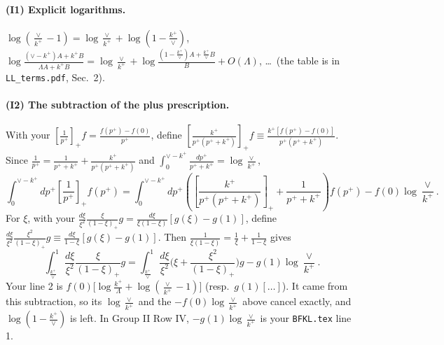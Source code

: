 \documentclass[10pt]{article}
\numberwithin{equation}{section}
\begin{document}
\paragraph{(I1) Explicit logarithms.} $\log(\frac{\vee}{k^+}-1)=\log\frac{\vee}{k^+}+\log(1-\frac{k^+}{\vee})$, $\log\frac{(\vee-k^+)A+k^+B}{\Lambda A+k^+B}=\log\frac{\vee}{k^+}+\log\frac{(1-\frac{k^+}{\vee})A+\frac{k^+}{\vee}B}{B}+O(\Lambda)$, \dots\ (the table is in \texttt{LL\_terms.pdf}, Sec.~2).

\paragraph{(I2) The subtraction of the plus prescription.} With your $\left[\frac{1}{p^+}\right]_+f=\frac{f(p^+)-f(0)}{p^+}$, define $\left[\frac{k^+}{p^+(p^++k^+)}\right]_+f\equiv\frac{k^+[f(p^+)-f(0)]}{p^+(p^++k^+)}$. Since $\frac{1}{p^+}=\frac{1}{p^++k^+}+\frac{k^+}{p^+(p^++k^+)}$ and $\int_0^{\vee-k^+}\frac{dp^+}{p^++k^+}=\log\frac{\vee}{k^+}$,
\begin{equation}
\int_0^{\vee-k^+}dp^+\left[\frac{1}{p^+}\right]_+f(p^+)=\int_0^{\vee-k^+}dp^+\left(\left[\frac{k^+}{p^+(p^++k^+)}\right]_++\frac{1}{p^++k^+}\right)f(p^+)-f(0)\log\frac{\vee}{k^+}.
\label{eq:I2}
\end{equation}
For $\xi$, with your $\frac{d\xi}{\xi^2}\frac{\xi}{(1-\xi)_+}g=\frac{d\xi}{\xi(1-\xi)}[g(\xi)-g(1)]$, define $\frac{d\xi}{\xi^2}\frac{\xi^2}{(1-\xi)_+}g\equiv\frac{d\xi}{1-\xi}[g(\xi)-g(1)]$. Then $\frac{1}{\xi(1-\xi)}=\frac{1}{\xi}+\frac{1}{1-\xi}$ gives
\begin{equation}
\int_{\frac{k^+}{\vee}}^1\frac{d\xi}{\xi^2}\frac{\xi}{(1-\xi)_+}g=\int_{\frac{k^+}{\vee}}^1\frac{d\xi}{\xi^2}\Big(\xi+\frac{\xi^2}{(1-\xi)_+}\Big)g-g(1)\log\frac{\vee}{k^+}.
\label{eq:I2xi}
\end{equation}
Your line 2 is $f(0)\big[\log\frac{k^+}{\Lambda}+\log(\frac{\vee}{k^+}-1)\big]$ (resp.\ $g(1)[\dots]$). It came from this subtraction, so its $\log\frac{\vee}{k^+}$ and the $-f(0)\log\frac{\vee}{k^+}$ above cancel exactly, and $\log(1-\frac{k^+}{\vee})$ is left. In Group II Row IV, $-g(1)\log\frac{\vee}{k^+}$ is your \texttt{BFKL.tex} line 1.
\end{document}
